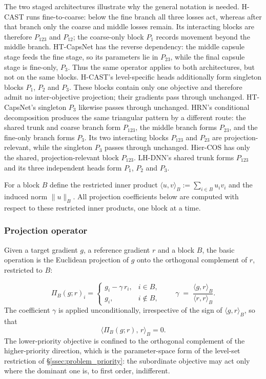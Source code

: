 The two staged architectures illustrate why the general notation is needed.
H-CAST runs fine-to-coarse: below the fine branch all three losses act, whereas
after that branch only the coarse and middle losses remain. Its interacting
blocks are therefore $P_{123}$ and $P_{12}$; the
coarse-only block $P_{1}$ records movement beyond the middle branch.
HT-CapsNet has the reverse dependency: the middle capsule stage feeds the fine
stage, so its parameters lie in $P_{23}$, while the final capsule stage is
fine-only, $P_{3}$. Thus the same operator applies to both architectures,
but not on the same blocks.
H-CAST's level-specific heads additionally form singleton blocks $P_1$, $P_2$
and $P_3$. These blocks contain only one objective and therefore admit no
inter-objective projection; their gradients pass through unchanged.
HT-CapsNet's singleton $P_3$ likewise passes through unchanged.
HRN's conditional decomposition produces the same triangular pattern by a
different route: the shared trunk and coarse branch form $P_{123}$, the middle
branch forms $P_{23}$, and the fine-only branch forms $P_3$. Its two interacting
blocks $P_{123}$ and $P_{23}$ are projection-relevant, while the singleton
$P_3$ passes through unchanged.
Hier-COS has only the shared, projection-relevant block $P_{123}$.
LH-DNN's shared trunk forms $P_{123}$ and its three independent heads form
$P_1$, $P_2$ and $P_3$.

For a block $B$ define the restricted inner product
$\langle u,v\rangle_B := \sum_{i\in B} u_i v_i$ and the induced norm
$\lVert u\rVert_B$. All projection coefficients below are computed with respect to these
restricted inner products, one block at a time.

\subsubsection{Projection operator}

Given a target gradient $g$, a reference gradient $r$ and a block $B$,
the basic operation is the Euclidean projection of $g$ onto the orthogonal complement of $r$,
restricted to $B$:

\[
\Pi_B(g;r)_i =
\begin{cases}
g_i - \gamma\, r_i, & i \in B,\\[1ex]
g_i, & i \notin B,
\end{cases}
\qquad
\gamma \;=\; \frac{\langle g,r\rangle_B}{\langle r,r\rangle_B} .
\]
The coefficient $\gamma$ is applied unconditionally, irrespective of the sign of
$\langle g,r\rangle_B$, so that
\[
\big\langle \Pi_B(g;r),\, r\big\rangle_B = 0 .
\]
The lower-priority objective is confined to the orthogonal complement of the higher-priority
direction, which is the parameter-space form of the level-set restriction of
\S\ref{ssec:problem_priority}: the subordinate objective may act only where the dominant one is,
to first order, indifferent.


